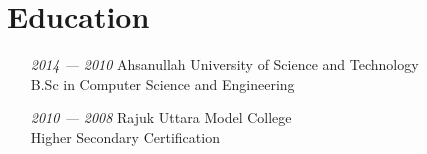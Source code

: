 \section{Education}

\begin{itemize}
  \item[\textit{2014 — 2010}]
  Ahsanullah University of Science and Technology\\
  B.Sc in Computer Science and Engineering

  \item[\textit{2010 — 2008}]
  Rajuk Uttara Model College\\
  Higher Secondary Certification
\end{itemize}
